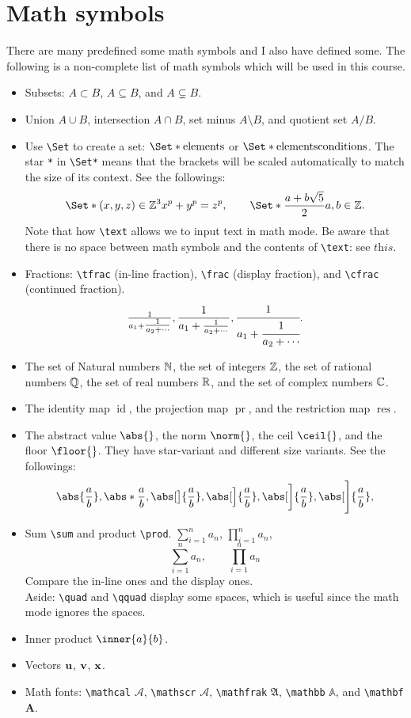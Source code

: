 \documentclass[11pt]{article}
\theoremstyle{plain}
\theoremstyle{definition}
\theoremstyle{remark}
\numberwithin{equation}{problem}
\DeclareMathOperator{\id}{id} %
\DeclareMathOperator{\pr}{pr} %
\DeclareMathOperator{\res}{res} %
\providecommand\given{}
\begin{document}
\section{Math symbols}\label{sec:2}
There are many predefined some math symbols and I also have defined some. 
The following is a non-complete list of math symbols which will be used in this course. 
\begin{itemize}
	\item Subsets: $A\subset B$, $A\subseteq B$, and $A\subsetneq B$. 
	\item Union $A\cup B$, intersection $A\cap B$, set minus $A\setminus B$, and quotient set $A/B$. 
	\item Use \verb|\Set| to create a set: $\Set*{ \text{elements} }$ or $\Set*{ \text{elements} \given \text{conditions} }$. The star \verb|*| in \verb|\Set*| means that the brackets will be scaled automatically to match the size of its context. See the followings:
	\[
		\Set*{	(x,y,z)\in\Z^3	\given	x^p+y^p=z^p	},
		\qquad
		\Set*{	\frac{a+b\sqrt{5}}{2}	\given	a,b\in\Z	}.
	\]
	Note that how \verb|\text| allows we to input text in math mode. Be aware that there is no space between math symbols and the contents of \verb|\text|: see $t\text{h}is$. 
	\item Fractions: \verb|\tfrac| (in-line fraction), \verb|\frac| (display fraction), and \verb|\cfrac| (continued fraction). 
	\[
		\tfrac{1}{a_1+\tfrac{1}{a_2+\cdots}},
		\frac{1}{a_1+\frac{1}{a_2+\cdots}},
		\cfrac{1}{a_1+\cfrac{1}{a_2+\cdots}}.
	\]
	\item The set of Natural numbers $\mathbb{N}$, the set of integers $\mathbb{Z}$, the set of rational numbers $\mathbb{Q}$, the set of real numbers $\mathbb{R}$, and the set of complex numbers $\mathbb{C}$. 
	\item The identity map $\id$, the projection map $\pr$, and the restriction map $\res$.
	\item The abstract value $\abs{}$, the norm $\norm{}$, the ceil $\ceil{}$, and the floor $\floor{}$. They have star-variant and different size variants. See the followings: 
	\[
		\abs{\frac{a}{b}},
		\abs*{\frac{a}{b}},
		\abs[\big]{\frac{a}{b}},
		\abs[\Big]{\frac{a}{b}},
		\abs[\bigg]{\frac{a}{b}},
		\abs[\Bigg]{\frac{a}{b}},
	\]
	\item Sum \verb|\sum| and product \verb|\prod|. $\sum_{i=1}^{n}a_n$, $\prod_{i=1}^{n}a_n$, 
	\[
		\sum_{i=1}^{n}a_n,\qquad
		\prod_{i=1}^{n}a_n
	\] 
	Compare the in-line ones and the display ones. \\
	Aside: \verb|\quad| and \verb|\qquad| display some spaces, which is useful since the math mode ignores the spaces. 
	\item Inner product $\inner{a}{b}$.
	\item Vectors $\mathbf{u}$, $\mathbf{v}$, $\mathbf{x}$.
	\item Math fonts: \verb|\mathcal| $\mathcal{A}$, \verb|\mathscr| $\mathscr{A}$, \verb|\mathfrak| $\mathfrak{A}$, \verb|\mathbb| $\mathbb{A}$, and \verb|\mathbf| $\mathbf{A}$.
\end{itemize}
\end{document}
